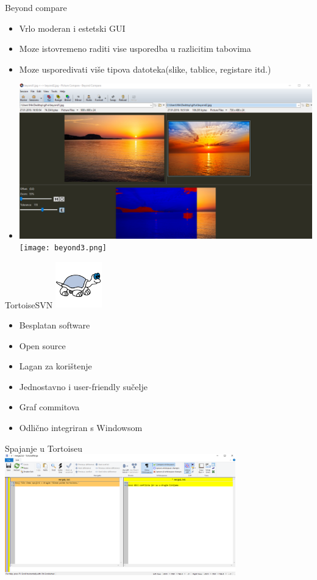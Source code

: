 \documentclass[10pt]{beamer}
\begin{document}
\begin{frame}{Beyond compare}
	\begin{itemize}
		\item Vrlo moderan i estetski GUI
		\item Moze istovremeno raditi vise usporedba u razlicitim tabovima
		\item Moze usporedivati više tipova datoteka(slike, tablice, registare itd.)
		\item 
		\includegraphics{beyond.png}
		\texttt{[image: beyond3.png]}
	\end{itemize}
\end{frame}

\begin{frame}{TortoiseSVN}
\includegraphics[width=2cm, height=2cm]{tortoise4.png}
\begin{itemize}
    \item Besplatan software
    \item Open source
    \item Lagan za korištenje
    \item Jednostavno i user-friendly sučelje
    \item Graf commitova
    \item Odlično integriran s Windowsom
\end{itemize}
\end{frame}

\begin{frame}{Spajanje u Tortoiseu}
\includegraphics[width=10cm]{tortoise1.png}
\end{frame}
\end{document}
